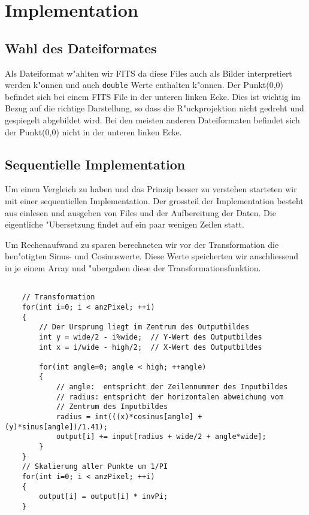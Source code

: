 \section{Implementation}

\subsection{Wahl des Dateiformates}

Als Dateiformat w"ahlten wir FITS da diese Files auch als Bilder interpretiert werden k"onnen und auch \texttt{double}  Werte enthalten k"onnen. Der Punkt(0,0) befindet sich bei einem FITS File in der unteren linken Ecke. Dies ist wichtig im Bezug auf die richtige Darstellung, so dass die R"uckprojektion nicht gedreht und gespiegelt abgebildet wird. Bei den meisten anderen Dateiformaten befindet sich der Punkt(0,0) nicht in der unteren linken Ecke.

\subsection{Sequentielle Implementation}

Um einen Vergleich zu haben und das Prinzip besser zu verstehen
starteten wir mit einer sequentiellen Implementation. Der grossteil
der Implementation besteht aus einlesen und ausgeben von Files und der
Aufbereitung der Daten. Die eigentliche "Ubersetzung findet auf ein paar
wenigen Zeilen statt.

Um Rechenaufwand zu sparen berechneten wir vor der Transformation
die ben"otigten Sinus- und Cosinuswerte. Diese Werte speicherten
wir anschliessend in je einem Array und "ubergaben diese der
Transformationsfunktion.


\begin{lstlisting}

	// Transformation	
	for(int i=0; i < anzPixel; ++i)
	{
		// Der Ursprung liegt im Zentrum des Outputbildes		
		int y = wide/2 - i%wide;  // Y-Wert des Outputbildes
		int x = i/wide - high/2;  // X-Wert des Outputbildes
		
		for(int angle=0; angle < high; ++angle)
		{
			// angle:  entspricht der Zeilennummer des Inputbildes			
			// radius: entspricht der horizontalen abweichung vom 
			// Zentrum des Inputbildes			
			radius = int(((x)*cosinus[angle] + (y)*sinus[angle])/1.41);
			output[i] += input[radius + wide/2 + angle*wide];
		}
	}
	// Skalierung aller Punkte um 1/PI	
	for(int i=0; i < anzPixel; ++i)
	{
		output[i] = output[i] * invPi;
 	}

\end{lstlisting}

